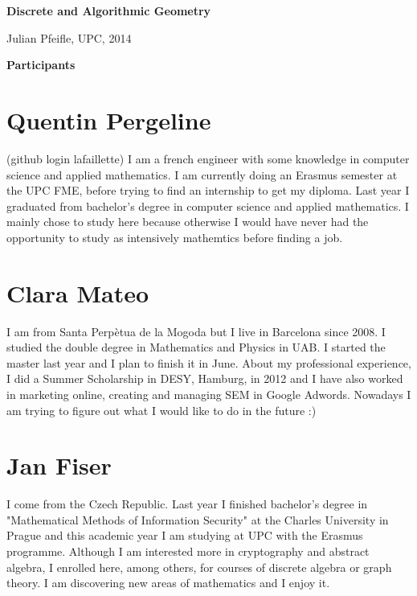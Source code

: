 \documentclass[11pt]{amsart}
\begin{document}
\begin{center}
\textbf{\sffamily
   Discrete and Algorithmic Geometry }

\medskip
   Julian Pfeifle,
   UPC, 2014 \mbox{}
\end{center}

\bigskip

\begin{center}
  \textbf{\sffamily Participants}
\end{center}

\medskip

\section*{Quentin Pergeline}
(github login lafaillette) I am a french engineer with some knowledge in computer science and applied mathematics.
I am currently doing an Erasmus semester at the UPC FME, before trying to find an internship to get my diploma.
Last year I graduated from bachelor's degree in computer science and applied mathematics. 
I mainly chose to study here because otherwise I would have never had the opportunity to study as intensively mathemtics before finding a job.


\section*{Clara Mateo}
I am from Santa Perp\`etua de la Mogoda but I live in Barcelona since 2008. I studied the double degree in Mathematics and Physics in UAB. I started the master last year and I plan to finish it in June. About my professional experience, I did a Summer Scholarship in DESY, Hamburg, in 2012 and I have also worked in marketing online, creating and managing SEM in Google Adwords. Nowadays I am trying to figure out what I would like to do in the future :)
\medskip


\section*{Jan Fiser}
I come from the Czech Republic. Last year I finished bachelor's degree in "Mathematical Methods of Information Security" at the Charles University in Prague and this academic year I am studying at UPC with the Erasmus programme.
Although I am interested more in cryptography and abstract algebra, I enrolled here, among others, for courses of discrete algebra or graph theory. I am discovering new areas of mathematics and I enjoy it.
\medskip
\end{document}
